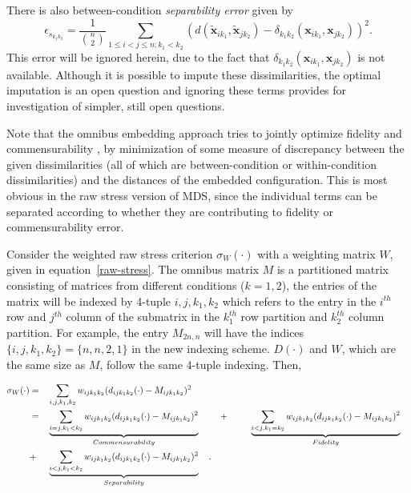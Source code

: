\documentclass[11pt]{article} %
\begin{document}
 There is also between-condition {\em separability error} given by
    $$\epsilon_{s_{k_1k_2}} = \frac{1}{{{n}\choose{2}}} \sum_{1 \leq i < j \leq n;k_1 <k_2} (d(\widetilde{\bm{x}}_{ik_1},\widetilde{\bm{x}}_{jk_2})-{ \delta_{k_1k_2}}(\bm{x}_{ik_1},\bm{x}_{jk_2}))^2.$$ This error will be ignored herein, due to the fact that 
$\delta_{k_1k_2}(\bm{x}_{ik_1},\bm{x}_{jk_2})$ is not  available. 
Although it is possible to impute these dissimilarities, the optimal  imputation is an open question and ignoring these terms provides for investigation of simpler, still open questions.


Note that the omnibus embedding approach tries to jointly optimize fidelity and commensurability , by minimization of some measure of discrepancy between the given dissimilarities (all of which are between-condition or within-condition dissimilarities) and the distances of the embedded configuration. This is most obvious in the  raw stress version of  MDS, since the individual terms can be separated according to whether they are contributing to  fidelity or  commensurability  error.

 Consider the weighted raw stress criterion $\sigma_{W}(\cdot)$ with a weighting matrix $W$, given in equation~\eqref{raw-stress}.
 The omnibus matrix $M$  is a partitioned matrix consisting of matrices from different conditions ($k={1,2}$),  the entries of the matrix will be indexed by 4-tuple ${i,j,k_1,k_2}$ which refers to the entry in the $i^{th}$ row and $j^{th}$ column of the submatrix in  the $k_1^{th}$  row partition and   $k_2^{th}$ column partition. For example, the entry ${M}_{2n,n}$ will have the indices $\{i,j,k_1,k_2\}=\{n,n,2,1\}$ in the new indexing scheme. $D(\cdot)$ and $W$, which are the same size as $M$, follow the same 4-tuple indexing. Then,
 
\begin{align}
\sigma_W(\cdot)  &= & &\sum_{i,j,k_1,k_2} {w_{ij{k_1}{k_2}}(d_{ij{k_1}{k_2}}(\cdot)-M_{ijk_1k_2})^2 } \notag\\
\hspace{3pt} &=& &\underbrace{\sum_{i=j,k_1<k_2}  {w_{ij{k_1}{k_2}}(d_{ij{k_1}{k_2}}(\cdot)-M_{ijk_1k_2})^2}}_{Commensurability}  \hspace{10pt}  &  + &\hspace{2.5em} \underbrace{\sum_{i<j,k_1=k_2}  {w_{ij{k_1}{k_2}}(d_{ij{k_1}{k_2}}(\cdot)-M_{ijk_1k_2})^2  }  } _{Fidelity}\notag\\
\hspace{3pt}&+&  &\underbrace{\sum_{i< j,k_1<k_2}  {w_{ij{k_1}{k_2}}(d_{ij{k_1}{k_2}}(\cdot)-M_{ijk_1k_2})^2  }  } _{Separability}\label{eq:FidCommSep}\hspace{10pt} .
\end{align}
\end{document}
